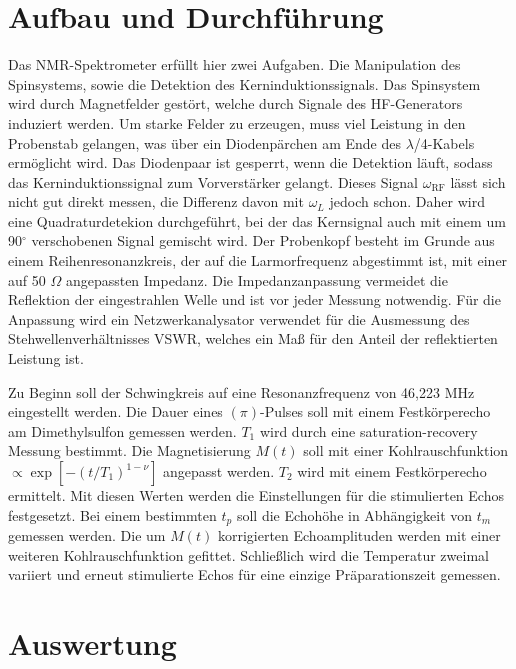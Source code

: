 \section{Aufbau und Durchführung}
Das NMR-Spektrometer erfüllt hier zwei Aufgaben. Die Manipulation des Spinsystems, sowie die Detektion des Kerninduktionssignals. Das Spinsystem wird durch
Magnetfelder gestört, welche durch Signale des HF-Generators induziert werden. Um starke Felder zu erzeugen, muss viel Leistung in den Probenstab gelangen,
was über ein Diodenpärchen am Ende des $\lambda$/4-Kabels ermöglicht wird. Das Diodenpaar ist gesperrt, wenn die Detektion läuft, sodass das Kerninduktionssignal
zum Vorverstärker gelangt. Dieses Signal $\omega_\text{RF}$ lässt sich nicht gut direkt messen, die Differenz davon mit $\omega_L$ jedoch schon. Daher wird
eine Quadraturdetekion durchgeführt, bei der das Kernsignal auch mit einem um 90$^\circ$ verschobenen Signal gemischt wird. Der Probenkopf besteht im Grunde
aus einem Reihenresonanzkreis, der auf die Larmorfrequenz abgestimmt ist, mit einer auf 50 $\Omega$ angepassten Impedanz. Die Impedanzanpassung vermeidet die 
Reflektion der eingestrahlen Welle und ist vor jeder Messung notwendig. Für die Anpassung wird ein Netzwerkanalysator verwendet für die Ausmessung des
Stehwellenverhältnisses VSWR, welches ein Maß für den Anteil der reflektierten Leistung ist.

\noindent Zu Beginn soll der Schwingkreis auf eine Resonanzfrequenz von 46,223 MHz eingestellt werden. Die Dauer eines $(\pi)$-Pulses soll mit einem 
Festkörperecho am Dimethylsulfon gemessen werden. $T_1$ wird durch eine saturation-recovery Messung bestimmt. Die Magnetisierung $M(t)$ soll mit einer
Kohlrauschfunktion $\propto \exp[-(t/T_1)^{1-\nu}]$ angepasst werden. $T_2$ wird mit einem Festkörperecho ermittelt. Mit diesen Werten werden die Einstellungen
für die stimulierten Echos festgesetzt. Bei einem bestimmten $t_p$ soll die Echohöhe in Abhängigkeit von $t_m$ gemessen werden. Die um $M(t)$ korrigierten
Echoamplituden werden mit einer weiteren Kohlrauschfunktion gefittet. Schließlich wird die Temperatur zweimal variiert und erneut stimulierte Echos für eine einzige
Präparationszeit gemessen.

\section{Auswertung}

